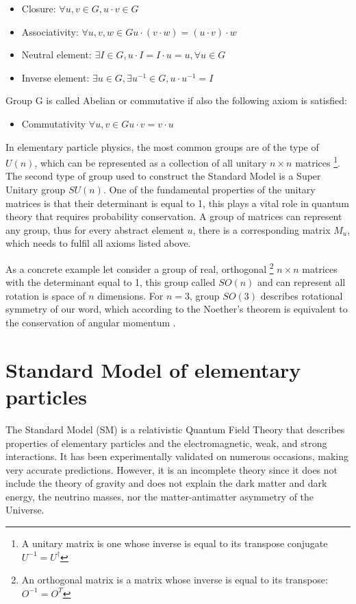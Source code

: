 \begin{itemize}
    \item Closure: $\forall u,v \in G, u\cdot v \in G$
    \item Associativity: $\forall u,v,w \in G u \cdot (v \cdot w ) = (u \cdot v) \cdot w$
    \item Neutral element:  $\exists I \in G, u \cdot I = I \cdot u = u, \forall u \in G$
    \item Inverse element:  $\exists u \in G, \exists u^{-1} \in G, u \cdot u^{-1} = I$
\end{itemize}

Group G is called Abelian or commutative if also the following axiom is satisfied:
\begin{itemize}
    \item Commutativity $\forall u,v \in G u \cdot v = v \cdot u$
\end{itemize}

In elementary particle physics, the most common groups are of the type of $U(n)$, which can be represented as a collection of all unitary $n\times n$ matrices \footnote{A unitary matrix is one whose inverse is equal to its transpose conjugate $U^{-1}=U^\dagger$}. The second type of group used to construct the Standard Model is a Super Unitary group $SU(n)$. One of the fundamental properties of the unitary matrices is that their determinant is equal to 1, this plays a vital role in quantum theory that requires probability
conservation. 
A group of matrices can represent any group, thus for every abstract element $u$, there is a corresponding matrix $M_u$, which needs to fulfil all axioms listed above. 

As a concrete example let consider a group of real, orthogonal \footnote{An orthogonal matrix is a matrix whose inverse is equal to its transpose: $O^{-1} = O^{T}$} $n\times n$ matrices with the determinant equal to  1, this group called $SO(n)$ and can represent all rotation is space of $n$ dimensions. For $n=3$, group $SO(3)$  describes rotational symmetry of our word, which according to the Noether's theorem is equivalent to the conservation of angular momentum \cite{griffiths}. 

\section{Standard Model of elementary particles}
\label{sec:SM}

The Standard Model (SM) is a relativistic Quantum Field Theory that describes properties of elementary particles and the electromagnetic, weak, and strong interactions. It has been experimentally validated on numerous occasions,
making very accurate predictions. However, it is an incomplete theory since it does not include the theory of gravity and does not explain the dark matter and dark energy, the neutrino masses, nor the matter-antimatter asymmetry of the Universe.

